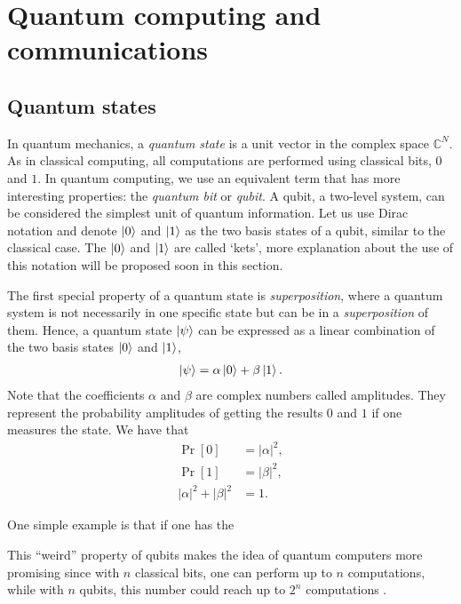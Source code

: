 \section{Quantum computing and communications} \label{quantum_computing}
\subsection{Quantum states}

In quantum mechanics, a \textit{quantum state} is a unit vector in the complex space $\mathbb{C}^N$.
As in classical computing, all computations are performed using classical bits, $0$ and $1$. In quantum computing, we use an equivalent term that has more interesting properties: the \textit{quantum bit} or \textit{qubit}. A qubit, a two-level system, can be considered the simplest unit of quantum information. Let us use Dirac notation and denote $\ket{0}$ and $\ket{1}$ as the two basis states of a qubit, similar to the classical case. The $\ket{0}$ and $\ket{1}$ are called `kets', more explanation about the use of this notation will be proposed soon in this section.

The first special property of a quantum state is \textit{superposition}, where a quantum system is not necessarily in one specific state but can be in a \textit{superposition} of them. Hence, a quantum state $\ket{\psi}$ can be expressed as a linear combination of the two basis states $\ket{0}$ and $\ket{1}$,
\begin{align}
\ket{\psi}=\alpha\ket{0}+\beta\ket{1}.
\label{eq:quantumstate}
\end{align}
Note that the coefficients $\alpha$ and $\beta$ are complex numbers called amplitudes. They represent the probability amplitudes of getting the results $0$ and $1$ if one measures the state. We have that
\begin{align}
\Pr[0] &= |\alpha|^2,\nonumber\\
\Pr[1] &= |\beta|^2,\nonumber\\
|\alpha|^2 + |\beta|^2 &= 1.
\end{align}

One simple example is that if one has the 

This ``weird'' property of qubits makes the idea of quantum computers more promising since with $n$ classical bits, one can perform up to $n$ computations, while with $n$ qubits, this number could reach up to $2^n$ computations .

